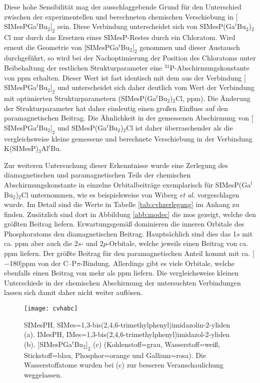 Diese hohe Sensibilität mag der ausschlaggebende Grund für den Unterschied zwischen der experimentellen und berechneten chemischen Verschiebung in $[$SIMesPGa$^\textit{t}$Bu$_2]_2$ sein. Diese Verbindung unterscheidet sich von SIMesP(Ga$^\textit{t}$Bu$_2$)$_2$Cl nur durch das Ersetzen eines SIMesP-Restes durch ein Chloratom. Wird erneut die Geometrie von $[$SIMesPGa$^\textit{t}$Bu$_2]_2$ genommen und dieser Austausch durchgeführt, so wird bei der Nachoptimierung der Position des Chloratoms unter Beibehaltung der restlichen Strukturparameter eine $^{31}$P-Abschirmungskonstante von \unit[336]{ppm} erhalten. Dieser Wert ist fast identisch mit dem aus der Verbindung $[$SIMesPGa$^\textit{t}$Bu$_2]_2$ und unterscheidet sich daher deutlich vom Wert der Verbindung mit optimierten Strukturparametern (SIMesP(Ga$^\textit{t}$Bu$_2$)$_2$Cl, \unit[380]{ppm}). Die Änderung der Strukturparameter hat daher eindeutig einen großen Einfluss auf den paramagnetischen Beitrag. Die Ähnlichkeit in der gemessenen Abschirmung von $[$SIMesPGa$^\textit{t}$Bu$_2]_2$ und SIMesP(Ga$^\textit{t}$Bu$_2$)$_2$Cl ist daher überraschender als die vergleichsweise kleine gemessene und berechnete Verschiebung in der Verbindung K(SIMesP)$_3$Al$^\textit{t}$Bu.

Zur weiteren Untersuchung dieser Erkenntnisse wurde eine Zerlegung des diamagnetischen und paramagnetischen Teils der chemischen Abschirmungskonstante in einzelne Orbitalbeiträge exemplarisch für SIMesP(Ga$^\textit{t}$Bu$_2$)$_2$Cl unternommen, wie es beispielsweise von Wiberg \textit{et al.}\supercite{wiberg1998nmr} vorgeschlagen wurde. Im Detail sind die Werte in Tabelle \ref{tab:cvhzerlegung} im Anhang zu finden. Zusätzlich sind dort in Abbildung \ref{abb:modec} die \acp{mo} gezeigt, welche den größten Beitrag liefern. Erwartungsgemäß dominieren die inneren Orbitale des Phosphoratoms den diamagnetischen Beitrag. Hauptsächlich sind dies das 1$s$ mit ca. \unit[500]{ppm} aber auch die 2$s$- und 2$p$-Orbitale, welche jeweils einen Beitrag von ca. \unit[100]{ppm} liefern. Der größte Beitrag für den paramagnetischen Anteil kommt mit ca. \unit[$-$180]{ppm} von der C--P$\pi$-Bindung. Allerdings gibt es viele Orbitale, welche ebenfalls einen Beitrag von mehr als \unit[10]{ppm} liefern. Die vergleichsweise kleinen Unterschiede in der chemischen Abschirmung der untersuchten Verbindungen lassen sich damit daher nicht weiter auflösen.

\begin{figure}[ht!]
	\centering
	\texttt{[image: cvhabc]}
	\captionsetup{figurewithin = chapter}
	\captionsetup{font=small, labelfont=bf}\caption[{Abbildung von SIMesPH, IMesPH und $[$SIMesPGa$^\textit{t}$Bu$_2]_2$}]{ SIMesPH, SIMes=1,3-bis(2,4,6-tri\-me\-thyl\-phe\-nyl)imi\-da\-zo\-lin-2-yli\-den \textsf{(a)}. IMesPH, IMes=1,3-bis(2,4,6-tri\-me\-thyl\-phe\-nyl)imi\-da\-zol-2-yli\-den \textsf{(b)}. $[$SIMesPGa$^\textit{t}$Bu$_2]_2$ \textsf{(c)} (Kohlenstoff=grau, Wasserstoff=weiß, Stickstoff=blau, Phosphor=orange und Gallium=rosa). Die Wasserstoffatome wurden bei \textsf{(c)} zur besseren Veranschaulichung weggelassen.}
\label{abb:cvhabc}
\end{figure}

